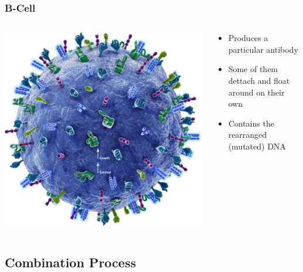 \documentclass{beamer}
\begin{document}
\begin{frame}
\frametitle{B-Cell}
\begin{columns}
  \begin{column}{.5\textwidth} 
    \includegraphics[width=\textwidth]{b-cell.jpg}
  \end{column}
  \begin{column}{.5\textwidth} 
    \begin{itemize}
     \item Produces a particular antibody
     \item Some of them dettach and float around on their own
     \item Contains the rearranged (mutated) DNA
    \end{itemize}
  \end{column}
\end{columns}
\end{frame}

\subsection{Combination Process}
\end{document}
